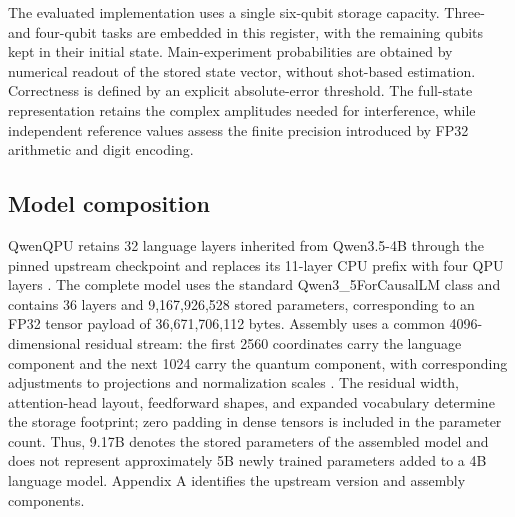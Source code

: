 \documentclass[11pt,a4paper]{article}
\begin{document}
The evaluated implementation uses a single six-qubit storage capacity. Three- and four-qubit tasks are embedded in this register, with the remaining qubits kept in their initial state. Main-experiment probabilities are obtained by numerical readout of the stored state vector, without shot-based estimation. Correctness is defined by an explicit absolute-error threshold. The full-state representation retains the complex amplitudes needed for interference, while independent reference values assess the finite precision introduced by FP32 arithmetic and digit encoding.

\subsection{Model composition}

QwenQPU retains 32 language layers inherited from Qwen3.5-4B \cite{ref21} through the pinned upstream checkpoint and replaces its 11-layer CPU prefix with four QPU layers \cite{ref22}. The complete model uses the standard Qwen3\_5ForCausalLM class and contains 36 layers and 9,167,926,528 stored parameters, corresponding to an FP32 tensor payload of 36,671,706,112 bytes. Assembly uses a common 4096-dimensional residual stream: the first 2560 coordinates carry the language component and the next 1024 carry the quantum component, with corresponding adjustments to projections and normalization scales \cite{ref22}. The residual width, attention-head layout, feedforward shapes, and expanded vocabulary determine the storage footprint; zero padding in dense tensors is included in the parameter count. Thus, 9.17B denotes the stored parameters of the assembled model and does not represent approximately 5B newly trained parameters added to a 4B language model. Appendix A identifies the upstream version and assembly components.
\end{document}
